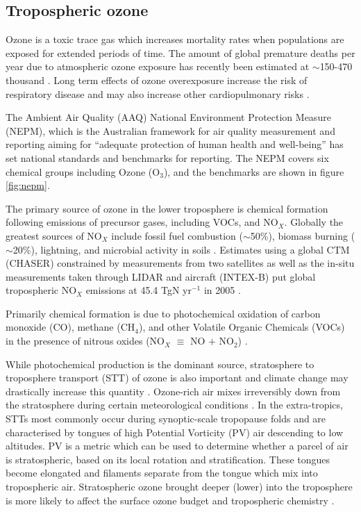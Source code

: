 \subsection{Tropospheric ozone}

Ozone is a toxic trace gas which increases mortality rates when populations are exposed for extended periods of time.
The amount of global premature deaths per year due to atmospheric ozone exposure has recently been estimated at $\sim$150-470 thousand \cite{Silva_2013, Lelieveld_2015}.
Long term effects of ozone overexposure increase the risk of respiratory disease and may also increase other cardiopulmonary risks \cite{Jerrett_2009}.

The Ambient Air Quality (AAQ) National Environment Protection Measure (NEPM), which is the Australian framework for air quality measurement and reporting aiming for ``adequate protection of human health and well-being'' has set national standards and benchmarks for reporting. The NEPM covers six chemical groups including Ozone (O$_3$), and the benchmarks are shown in figure \ref{fig:nepm}.

The primary source of ozone in the lower troposphere is chemical formation following emissions of precursor gases, including VOCs, and NO$_X$.
Globally the greatest sources of NO$_X$ include fossil fuel combustion ($\sim$50\%), biomass burning ($\sim$20\%), lightning, and microbial activity in soils \citep{Delmas_1997}.
Estimates using a global CTM (CHASER) constrained by measurements from two satellites as well as the in-situ measurements taken through LIDAR and aircraft (INTEX-B) put global tropospheric NO$_X$ emissions at 45.4 TgN yr$^{-1}$ in 2005 \cite{Miyazaki_2011}.

Primarily chemical formation is due to photochemical oxidation of carbon monoxide (CO), methane (CH$_4$), and other Volatile Organic Chemicals (VOCs) in the presence of nitrous oxides (NO$_X$ $\equiv$ NO $+$ NO$_2$) \cite{Stevenson_2006}.

While photochemical production is the dominant source, stratosphere to troposphere transport (STT) of ozone is also important and climate change may drastically increase this quantity \cite{Hegglin_2009}.
Ozone-rich air mixes irreversibly down from the stratosphere during certain meteorological conditions \citep{Sprenger2003,Mihalikova2012}.
In the extra-tropics, STTs most commonly occur during synoptic-scale tropopause folds \citep{Sprenger2003} and are characterised by tongues of high Potential Vorticity (PV) air descending to low altitudes.
PV is a metric which can be used to determine whether a parcel of air is stratospheric, based on its local rotation and stratification.
These tongues become elongated and filaments separate from the tongue which mix into tropospheric air.
Stratospheric ozone brought deeper (lower) into the troposphere is more likely to affect the surface ozone budget and tropospheric chemistry \citep{Zanis2003,Langford_2009}.


